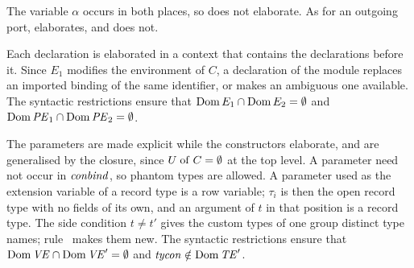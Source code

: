 \begin{rulecomments}
 The variable $\alpha$ occurs in both places, so
 does not elaborate. As for an outgoing
port,  elaborates, and
 does not.

 Each declaration is elaborated in a context that
contains the declarations before it. Since $E_1$ modifies the environment of
$C$, a declaration of the module replaces an imported binding of the same
identifier, or makes an ambiguous one available. The syntactic restrictions
ensure that $\mathrm{Dom}\, E_1 \cap \mathrm{Dom}\, E_2 = \emptyset$ and $\mathrm{Dom}\,\mathit{PE}_1 \cap \mathrm{Dom}\,\mathit{PE}_2
= \emptyset$.
\end{rulecomments}



\begin{rulecomments}
 The parameters are made explicit while the
constructors elaborate, and are generalised by the closure, since $U \mathrel{\mathrm{of}} C =
\emptyset$ at the top level. A parameter need not occur in $\mathit{conbind}$, so
phantom types are allowed. A parameter used as the extension variable of a
record type is a row variable; $\tau_i$ is then the open record type with no
fields of its own, and an argument of $t$ in that position is a record type.
The side condition $t \neq t'$ gives the custom types of one group distinct
type names; rule~ makes them new. The syntactic
restrictions ensure that $\mathrm{Dom}\,\mathit{VE} \cap \mathrm{Dom}\,\mathit{VE}' = \emptyset$ and $\mathit{tycon} \notin
\mathrm{Dom}\,\mathit{TE}'$.
\end{rulecomments}



